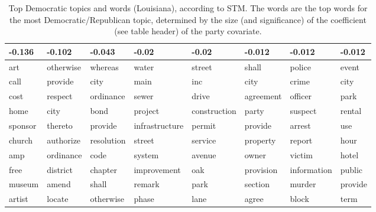 \begin{table}[ht]
\centering
\begin{tabular}{llllllll}
  \hline
-0.136 & -0.102 & -0.043 & -0.02 & -0.02 & -0.012 & -0.012 & -0.012 \\ 
  \hline
art & otherwise & whereas & water & street & shall & police & event \\ 
  call & provide & city & main & inc & city & crime & city \\ 
  cost & respect & ordinance & sewer & drive & agreement & officer & park \\ 
  home & city & bond & project & construction & party & suspect & rental \\ 
  sponsor & thereto & provide & infrastructure & permit & provide & arrest & use \\ 
  church & authorize & resolution & street & service & property & report & hour \\ 
  amp & ordinance & code & system & avenue & owner & victim & hotel \\ 
  free & district & chapter & improvement & oak & provision & information & public \\ 
  museum & amend & shall & remark & park & section & murder & provide \\ 
  artist & locate & otherwise & phase & lane & agree & block & term \\ 
   \hline
\end{tabular}
\caption{Top Democratic topics and words (Louisiana), according to STM. 
The words are the top words for the most Democratic/Republican topic, determined
by the size (and significance) of the coefficient (see table header) of the party covariate.} 
\label{tabSTMLADem}
\end{table}


